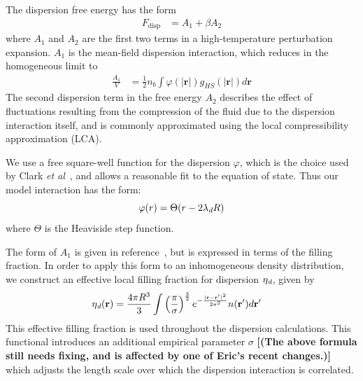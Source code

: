 \documentclass[letterpaper,twocolumn,amsmath,amssymb,prb]{revtex4-1}
\newcommand{\red}[1]{{\bf \color{red} #1}}
\newcommand{\xx}{\textbf{r}}
\newcommand{\fixme}[1]{\red{[#1]}}
\begin{document}
The dispersion free energy has the form~\cite{gil-villegas-1997-SAFT-VR}
\begin{align}
  F_\text{disp} &= A_1 + \beta A_2
\end{align}
where $A_1$ and $A_2$ are the first two terms in a high-temperature
perturbation expansion.  $A_1$ is the mean-field dispersion
interaction, which reduces in the homogeneous limit to
\begin{align}\label{eq:A1-simple}
  \frac{A_1}{V} &= \frac12 n_b \int \varphi(\left|\xx\right|)
  g_{HS}(\left|\xx\right|) d\xx
\end{align}
The second dispersion term in the free energy $A_2$ describes the
effect of fluctuations resulting from the compression of the fluid due
to the dispersion interaction itself, and is commonly approximated
using the local compressibility approximation (LCA).

We use a free square-well function for the dispersion $\varphi$, which
is the choice used by Clark \emph{et al}~\cite{clark2006developing},
and allows a reasonable fit to the equation of state.  Thus our model
interaction has the form:
\begin{equation}
  \varphi(r) = \Theta(r-2 \lambda_\textit{d} R)
\end{equation}
where $\Theta$ is the Heaviside step function.

The form of $A_1$ is given in
reference~\cite{gil-villegas-1997-SAFT-VR}, but is expressed in terms
of the filling fraction.  In order to apply this form to an
inhomogeneous density distribution, we construct an effective local
filling fraction for dispersion $\eta_\textit{d}$, given by
\begin{align}
  \etadisp(\xx) &= \frac{4\pi R^3}{3}
  \int \left(\frac{\pi}{\sigma}\right)^{\frac32}
  e^{-\frac{|\xx-\xx'|^2}{2\sigma^2}} n(\xx') d\xx'
\end{align}
This effective filling fraction is used throughout the dispersion
calculations.  This functional introduces an additional empirical
parameter $\sigma$ \fixme{(The above formula still needs fixing, and
  is affected by one of Eric's recent changes.)}
which adjusts the length scale over which the dispersion interaction
is correlated.
\end{document}
